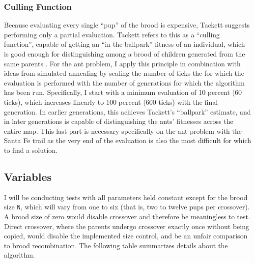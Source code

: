 \documentclass{acm_proc_article-sp}
\begin{document}
\subsubsection{Culling Function}
Because evaluating every single ``pup'' of the brood is expensive,
Tackett suggests performing only a partial evaluation. Tackett refers
to this as a ``culling function'', capable of getting an ``in the
ballpark'' fitness of an individual, which is good enough for
distinguishing among a brood of children generated from the same
parents \cite{Tackett:Brood}. For the ant problem, I apply this
principle in combination with ideas from simulated annealing by
scaling the number of ticks the for which the evaluation is performed
with the number of generations for which the algorithm has been
run. Specifically, I start with a minimum evaluation of 10 percent (60
ticks), which increases linearly to 100 percent (600 ticks) with the
final generation. In earlier generations, this achieves Tackett's
``ballpark'' estimate, and in later generations is capable of
distinguishing the ants' fitnesses across the entire map. This last
part is necessary specifically on the ant problem with the Santa Fe
trail as the very end of the evaluation is also the most difficult for
which to find a solution.

\subsection{Variables}
I will be conducting tests with all parameters held constant except
for the brood size \texttt{N}, which will vary from one to six (that is, two
to twelve pups per crossover). A brood size of zero would disable
crossover and therefore be meaningless to test. Direct crossover,
where the parents undergo crossover exactly once without being copied,
would disable the implemented size control, and be an unfair
comparison to brood recombination. The following table summarizes
details about the algorithm.
\end{document}
